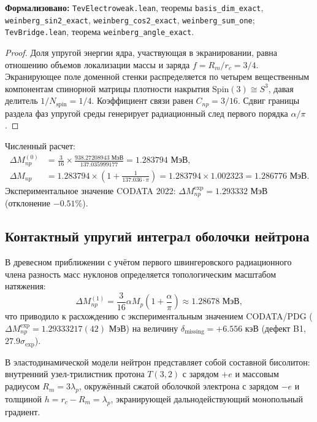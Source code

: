 \documentclass[11pt,a4paper]{article}
\theoremstyle{definition}
\theoremstyle{remark}
\begin{document}
\noindent\small\textbf{Формализовано:} \texttt{TevElectroweak.lean}, теоремы \texttt{basis_dim_exact}, \texttt{weinberg_sin2_exact}, \texttt{weinberg_cos2_exact}, \texttt{weinberg_sum_one}; \texttt{TevBridge.lean}, теорема \texttt{weinberg_angle_exact}.
\begin{proof}
	Доля упругой энергии ядра, участвующая в экранировании, равна отношению объемов локализации массы и заряда $f = R_m / r_c = 3/4$. Экранирующее поле доменной стенки распределяется по четырем вещественным компонентам спинорной матрицы плотности накрытия $\mathrm{Spin}(3) \cong S^3$, давая делитель $1/N_{\mathrm{spin}} = 1/4$. Коэффициент связи равен $C_{np} = 3/16$. Сдвиг границы раздела фаз упругой среды генерирует радиационный след первого порядка $\alpha/\pi$.
\end{proof}
	
Численный расчет:
\begin{align}
\Delta M_{np}^{(0)} &= \frac{3}{16} \times \frac{938.27208943\text{ МэВ}}{137.035999177} = 1.283794\text{ МэВ}, \\
\Delta M_{np} &= 1.283794 \times \left(1 + \frac{1}{137.036 \cdot \pi}\right) = 1.283794 \times 1.002323 = 1.286776\text{ МэВ}.
\end{align}
Экспериментальное значение CODATA 2022: $\Delta M_{np}^{\mathrm{exp}} = 1.293332\text{ МэВ}$ (отклонение $-0.51\%$).

\subsection{Контактный упругий интеграл оболочки нейтрона}
\label{subsec:b1_contact_resolution}
В древесном приближении с учётом первого швингеровского радиационного члена разность масс нуклонов определяется топологическим масштабом натяжения:
\begin{equation}
\Delta M_{np}^{(1)} = \frac{3}{16} \alpha M_p \left(1 + \frac{\alpha}{\pi}\right) \approx 1.28678 \text{ МэВ},
\end{equation}
что приводило к расхождению с экспериментальным значением CODATA/PDG ($\Delta M_{np}^{\mathrm{exp}} = 1.29333217(42)\text{ МэВ}$) на величину $\delta_{\mathrm{missing}} = +6.556\text{ кэВ}$ (дефект B1, $27.9\sigma_{\mathrm{exp}}$).

В эластодинамической модели нейтрон представляет собой составной бисолитон: внутренний узел-трилистник протона $T(3,2)$ с зарядом $+e$ и массовым радиусом $R_m = 3\lambda_p$, окружённый сжатой оболочкой электрона с зарядом $-e$ и толщиной $h = r_c - R_m = \lambda_p$, экранирующей дальнодействующий монопольный градиент.
\end{document}
